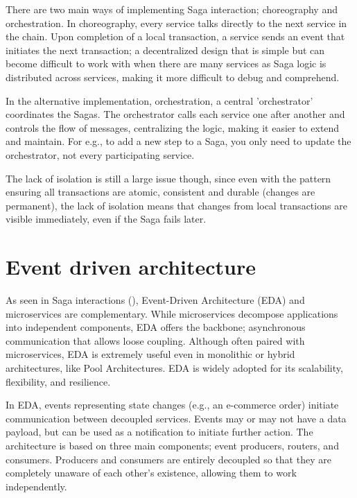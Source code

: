 \documentclass[]{final}
\begin{document}
There are two main ways of implementing Saga interaction; choreography and
orchestration. In choreography, every service talks directly to the next
service in the chain. Upon completion of a local transaction, a service sends
an event that initiates the next transaction; a decentralized design that is
simple but can become difficult to work with when there are many services
as Saga logic is distributed across services, making it more difficult
to debug and comprehend.%

In the alternative implementation, orchestration, a central ’orchestrator’
coordinates the Sagas. The orchestrator calls each service one after another
and controls the flow of messages, centralizing the logic, making it easier
to extend and maintain. For e.g., to add a new step to a Saga, you only need
to update the orchestrator, not every participating service.%

The lack of isolation is still a large issue though, since even with the
pattern ensuring all transactions are atomic, consistent and durable
(changes are permanent), the lack of isolation means that changes from local
transactions are visible immediately, even if the Saga fails later.

\section{Event driven architecture}


As seen in Saga interactions {\hypersetup{linkcolor=teal}(\pageref{saga_events})},
Event-Driven Architecture (EDA) and microservices are complementary. While
microservices decompose applications into independent components, EDA offers
the backbone; asynchronous communication that allows loose coupling. Although
often paired with microservices, EDA is extremely useful even in monolithic or
hybrid architectures, like Pool Architectures. EDA is widely adopted for its
scalability, flexibility, and resilience.

In EDA, events representing state changes (e.g., an e-commerce order) initiate
communication between decoupled services. Events may or may not have a data
payload, but can be used as a notification to initiate further action. The
architecture is based on three main components; event producers, routers, and
consumers. Producers and consumers are entirely decoupled so that they are
completely unaware of each other’s existence, allowing them to work
independently.
\end{document}
